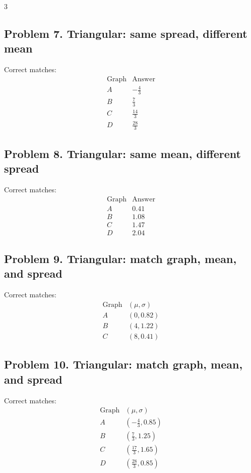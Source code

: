\begin{multicols}{3}
\subsection*{Problem 7. Triangular: same spread, different mean}
Correct matches:
\[
\begin{array}{c|c}
\text{Graph} & \text{Answer} \\
\hline
A & -\frac{4}{3} \\
B & \frac{7}{3} \\
C & \frac{14}{3} \\
D & \frac{28}{3}
\end{array}
\]

\subsection*{Problem 8. Triangular: same mean, different spread}
Correct matches:
\[
\begin{array}{c|c}
\text{Graph} & \text{Answer} \\
\hline
A & 0.41 \\
B & 1.08 \\
C & 1.47 \\
D & 2.04
\end{array}
\]

\subsection*{Problem 9. Triangular: match graph, mean, and spread}
Correct matches:
\[
\begin{array}{c|c}
\text{Graph} & (\mu,\sigma) \\
\hline
A & (0,0.82) \\
B & (4,1.22) \\
C & (8,0.41)
\end{array}
\]

\subsection*{Problem 10. Triangular: match graph, mean, and spread}
Correct matches:
\[
\begin{array}{c|c}
\text{Graph} & (\mu,\sigma) \\
\hline
A & \left(-\frac{4}{3},0.85\right) \\
B & \left(\frac{7}{3},1.25\right) \\
C & \left(\frac{17}{3},1.65\right) \\
D & \left(\frac{28}{3},0.85\right)
\end{array}
\]


\end{multicols}
